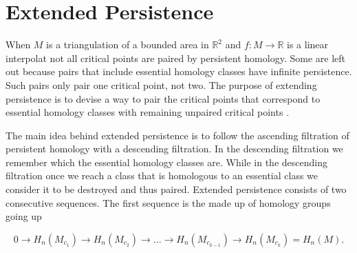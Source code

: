 \section{Extended Persistence}



%
%

%



When $M$ is a triangulation of a bounded area in $\mathbb{R}^2$ and $f: M \to \mathbb{R}$ is a linear interpolat not all critical points are paired by persistent homology. Some are left out because pairs that include essential homology classes have infinite persistence. Such pairs only pair one critical point, not two. The purpose of extending persistence is to devise a way to pair the critical points that correspond to essential homology classes with remaining unpaired critical points \cite{persistence-extended}.

The main idea behind extended persistence is to follow the ascending filtration of persistent homology with a descending filtration. In the descending filtration we remember which the essential homology classes are. While in the descending filtration once we reach a class that is homologous to an essential class we consider it to be destroyed and thus paired. Extended persistence consists of two consecutive sequences. The first sequence is the made up of homology groups going up

$$ 0 \rightarrow H_n(M_{c_1}) \rightarrow H_n(M_{c_2}) \rightarrow ... \rightarrow H_n(M_{c_{k-1}}) \rightarrow H_n(M_{c_k}) =  H_n(M) .$$

